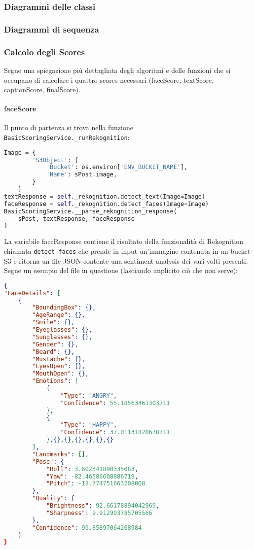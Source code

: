 \subsubsection{Diagrammi delle classi}
\subsubsection{Diagrammi di sequenza}
\subsubsection{Calcolo degli Scores}
Segue una spiegazione più dettagliata degli algoritmi e delle funzioni che si occupano di calcolare
i quattro scores necessari (faceScore, textScore, captionScore, finalScore).

\paragraph{faceScore} \aCapo
Il punto di partenza si trova nella funzione \verb+BasicScoringService._runRekognition+:
\begin{lstlisting}[language=Python]
Image = {
        'S3Object': {
            'Bucket': os.environ['ENV_BUCKET_NAME'],
            'Name': sPost.image,
        }
    }
textResponse = self._rekognition.detect_text(Image=Image)
faceResponse = self._rekognition.detect_faces(Image=Image)
BasicScoringService.__parse_rekognition_response(
    sPost, textResponse, faceResponse
)
\end{lstlisting}
La variabile faceResponse contiene il risultato della funzionalità
di Rekognition chiamata \verb+detect_faces+ che prende in input un'immagine contenuta
in un bucket S3 e ritorna un file JSON contente una sentiment analysis dei vari volti presenti.\\
Segue un esempio del file in questione (lasciando implicito ciò che non serve):
\begin{lstlisting}[language=JSON]
{
"FaceDetails": [
    {
        "BoundingBox": {},
        "AgeRange": {},
        "Smile": {},
        "Eyeglasses": {},
        "Sunglasses": {},
        "Gender": {},
        "Beard": {},
        "Mustache": {},
        "EyesOpen": {},
        "MouthOpen": {},
        "Emotions": [
            {
                "Type": "ANGRY",
                "Confidence": 55.18563461303711
            },
            {
                "Type": "HAPPY",
                "Confidence": 37.01131820678711
            },{},{},{},{},{},{}
        ],
        "Landmarks": [],
        "Pose": {
            "Roll": 3.602341890335083,
            "Yaw": -82.46586608886719,
            "Pitch": -18.774751663208008
        },
        "Quality": {
            "Brightness": 92.66178894042969,
            "Sharpness": 9.912903785705566
        },
        "Confidence": 99.85897064208984
    }
}
\end{lstlisting}
